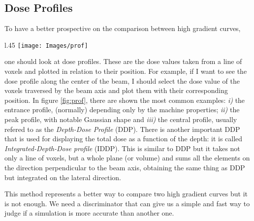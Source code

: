 \documentclass[12pt, a4paper, twoside]{book}
\begin{document}
\subsection{Dose Profiles}
\label{sec:dose_prof}
To have a better prospective on the comparison between high gradient curves,
\begin{wrapfigure}{l}{.45\textwidth}
\vspace{-5mm}
{\texttt{[image: Images/prof]}}
\caption{Profiles example}
\label{fig:prof}
\vspace{-10mm}
\end{wrapfigure}
\noindent one should look at dose profiles. 
These are the dose values taken from a line of voxels and plotted in relation to their position. For example, if I want to see the dose profile along the center of the beam, I should select the dose value of the voxels traversed by the beam axis and plot them with their corresponding position.
In figure \ref{fig:prof}, there are shown the most common examples: \emph{i)} the entrance profile, (normally) depending only by the machine properties; \emph{ii)} the peak profile, with notable Gaussian shape and \emph{iii)} the central profile, usually refered to as the \emph{Depth-Dose Profile} (DDP). There is another important DDP that is used for displaying the total dose as a function of the depth: it is called \emph{Integrated-Depth-Dose profile} (IDDP). This is similar to DDP but it takes not only a line of voxels, but a whole plane (or volume) and sums all the elements on the direction perpendicular to the beam axis, obtaining the same thing as DDP but integrated on the lateral direction.

This method represents a better way to compare two high gradient curves but it is not enough. We need a discriminator that can give us a simple and fast way to judge if a simulation is more accurate than another one.
\end{document}
